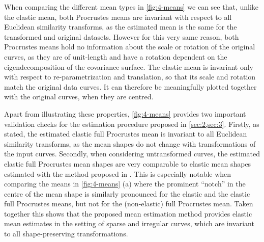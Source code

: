 When comparing the different mean types in \cref{fig:4-means} we can see that, unlike the elastic mean, both Procrustes means are invariant with respect to all Euclidean similarity transforms, as the estimated mean is the same for the transformed and original datasets.
However for this very same reason, both Procrustes means hold no information about the scale or rotation of the original curves, as they are of unit-length and have a rotation dependent on the eigendecomposition of the covariance surface.
The elastic mean is invariant only with respect to re-parametrization and translation, so that its scale and rotation match the original data curves.
It can therefore be meaningfully plotted together with the original curves, when they are centred.

Apart from illustrating these properties, \cref{fig:4-means} provides two important validation checks for the estimation procedure proposed in \cref{sec:2,sec:3}.
Firstly, as stated, the estimated elastic full Procrustes mean is invariant to all Euclidean similarity transforms, as the mean shapes do not change with transformations of the input curves.
Secondly, when considering untransformed curves, the estimated elastic full Procrustes mean shapes are very comparable to elastic mean shapes estimated with the method proposed in \cite{Steyer2021}.
This is especially notable when comparing the means in \cref{fig:4-means} (a) where the prominent \enquote{notch} in the centre of the mean shape is similarly pronounced for the elastic and the elastic full Procrustes means, but not for the (non-elastic) full Procrustes mean.
Taken together this shows that the proposed mean estimation method provides elastic mean estimates in the setting of sparse and irregular curves, which are invariant to all shape-preserving transformations.


